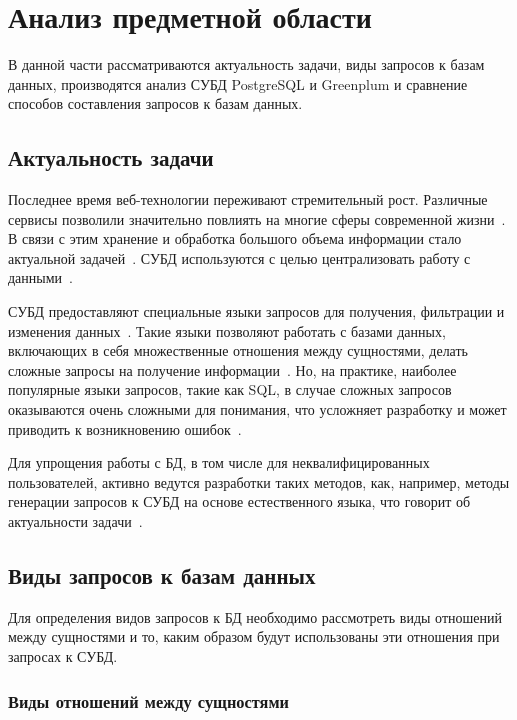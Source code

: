 \chapter{Анализ предметной области}

В данной части рассматриваются актуальность задачи, виды запросов к базам данных, производятся анализ СУБД PostgreSQL и Greenplum и сравнение способов составления запросов к базам данных.

\section{Актуальность задачи}

Последнее время веб-технологии переживают стремительный рост. Различные сервисы позволили значительно повлиять на многие сферы современной жизни~\cite{murodilov2023web}. В связи с этим хранение и обработка большого объема информации стало актуальной задачей~\cite{картавец2019актуальность}. СУБД используются с целью централизовать работу с данными~\cite{стасышин2022проектирование}.

СУБД предоставляют специальные языки запросов для получения, фильтрации и изменения данных~\cite{song2023testing}. Такие языки позволяют работать с базами данных, включающих в себя множественные отношения между сущностями, делать сложные запросы на получение информации~\cite{hohenstein1992sql}. Но, на практике, наиболее популярные языки запросов, такие как SQL, в случае сложных запросов оказываются очень сложными для понимания, что усложняет разработку и может приводить к возникновению ошибок~\cite{date2011sql}.

Для упрощения работы с БД, в том числе для неквалифицированных пользователей, активно ведутся разработки таких методов, как, например,  методы генерации запросов к СУБД на основе естественного языка, что говорит об актуальности задачи~\cite{fu2023catsql,naik2023sql,sun2023sql}.


\section{Виды запросов к базам данных}

Для определения видов запросов к БД необходимо рассмотреть виды отношений между сущностями и то, каким образом будут использованы эти отношения при запросах к СУБД.

\subsection{Виды отношений между сущностями}


